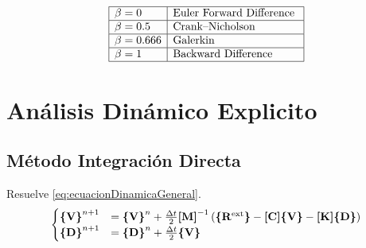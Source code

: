 \[
\begin{array}{|l|l|}\hline \beta=0 & {\text {Euler Forward Difference }} \\ \hline \beta=0.5 & {\text {Crank--Nicholson }} \\ \hline \beta=0.666 & {\text {Galerkin }} \\ \hline \beta=1 & {\text {Backward Difference }} \\ \hline\end{array}
\]

\section{Análisis Dinámico Explicito}

\subsection*{Método Integración Directa}
Resuelve \ref{eq:ecuacionDinamicaGeneral}.
\begin{align*}
	\begin{cases}
	\Cme{V}^{n+1}&=\Cme{V}^n + \frac{\Delta t}{2}  \Mme{M}^{-1}\left(\Cme{R^{\mathrm{ext}}} - \MC \Cme{V} - \MK \Cme{D} \right) \\
	\Cme{D}^{n+1}&=\Cme{D}^n + \frac{\Delta t}{2} \Cme{V}
	\end{cases}
\end{align*}


